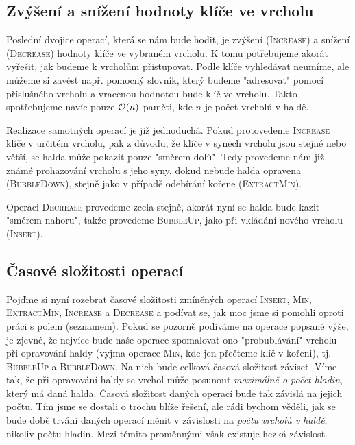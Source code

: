 \subsection{Zvýšení a snížení hodnoty klíče ve vrcholu}

Poslední dvojice operací, která se nám bude hodit, je zvýšení (\textsc{Increase}) a snížení (\textsc{Decrease}) hodnoty klíče ve vybraném vrcholu. K tomu potřebujeme akorát vyřešit, jak budeme k vrcholům přistupovat. Podle klíče vyhledávat neumíme, ale můžeme si zavést např. pomocný slovník, který budeme "adresovat" pomocí příslušného vrcholu a vracenou hodnotou bude klíč ve vrcholu. Takto spotřebujeme navíc pouze $\mathcal{O}(n)$ paměti, kde $n$ je počet vrcholů v haldě.

Realizace samotných operací je již jednoduchá. Pokud protovedeme \textsc{Increase} klíče v určitém vrcholu, pak z důvodu, že klíče v synech vrcholu jsou stejné nebo větší, se halda může pokazit pouze "směrem dolů". Tedy provedeme nám již známé prohazování vrcholu s jeho syny, dokud nebude halda opravena (\textsc{BubbleDown}), stejně jako v případě odebírání kořene (\textsc{ExtractMin}).

Operaci \textsc{Decrease} provedeme zcela stejně, akorát nyní se halda bude kazit "směrem nahoru", takže provedeme \textsc{BubbleUp}, jako při vkládání nového vrcholu (\textsc{Insert}).

\subsection{Časové složitosti operací}

Pojďme si nyní rozebrat časové složitosti zmíněných operací \textsc{Insert}, \textsc{Min}, \textsc{ExtractMin}, \textsc{Increase} a \textsc{Decrease} a podívat se, jak moc jsme si pomohli oproti práci s polem (seznamem). Pokud se pozorně podíváme na operace popsané výše, je zjevné, že nejvíce bude naše operace zpomalovat ono "probublávání" vrcholu při opravování haldy (vyjma operace \textsc{Min}, kde jen přečteme klíč v kořeni), tj. \textsc{BubbleUp} a \textsc{BubbleDown}. Na nich bude celková časová složitost záviset.
Víme tak, že při opravování haldy se vrchol může posunout \emph{maximálně o počet hladin}, který má daná halda. Časová složitost daných operací bude tak závislá na jejich počtu. Tím jsme se dostali o trochu blíže řešení, ale rádi bychom věděli, jak se bude době trvání daných operací měnit v závislosti na \emph{počtu vrcholů v haldě}, nikoliv počtu hladin. Mezi těmito proměnnými však existuje hezká závislost.

